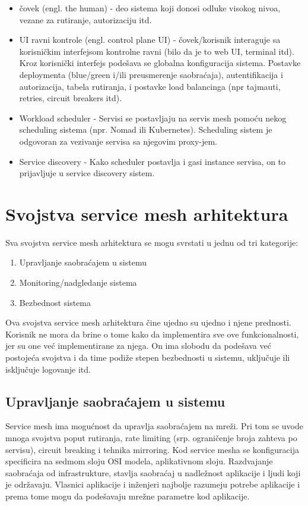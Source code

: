\documentclass[a4paper,12pt]{report}
\begin{document}
\begin{itemize}
	\item čovek (engl. the human) - deo sistema koji donosi odluke visokog nivoa, vezane za rutiranje, autorizaciju itd. 
	\item UI ravni kontrole (engl. control plane UI) - čovek/korisnik interaguje sa korisničkim interfejsom kontrolne ravni (bilo da je to web UI, terminal itd). Kroz korisnički interfejs podešava se globalna konfiguracija sistema. Postavke deploymenta (blue/green i/ili preusmerenje saobraćaja), autentifikacija i autorizacija, tabela rutiranja, i postavke load balancinga (npr tajmauti, retries, circuit breakers itd).
	\item Workload scheduler - Servisi se postavljaju na servis mesh pomoću nekog scheduling sistema (npr. Nomad ili Kubernetes). Scheduling sistem je odgovoran za vezivanje servisa sa njegovim proxy-jem.
	\item Service discovery - Kako scheduler postavlja i gasi instance servisa, on to prijavljuje u service discovery sistem. 
\end{itemize}


\chapter{Svojstva service mesh arhitektura}

Sva svojstva service mesh arhitektura se mogu svrstati u jednu od tri kategorije:

\begin{enumerate}
	\item Upravljanje saobraćajem u sistemu
	\item Monitoring/nadgledanje sistema
	\item Bezbednost sistema
\end{enumerate}

Ova svojstva service mesh arhitektura čine ujedno su ujedno i njene prednosti. Korisnik ne mora da brine o tome kako da implementira sve ove funkcionalnosti, jer su one već implementirane za njega. On ima slobodu da podešava već postojeća svojstva i da time podiže stepen bezbednosti u sistemu, uključuje ili isključuje logovanje itd. 

\section{Upravljanje saobraćajem u sistemu}

Service mesh ima mogućnost da upravlja saobraćajem na mreži. Pri tom se uvode mnoga svojstva poput rutiranja, rate limiting (srp. ograničenje broja zahteva po servisu),  circuit breaking i tehnika mirroring. Kod service mesha se konfiguracija specificira na sedmom sloju OSI modela, aplikativnom sloju. Razdvajanje saobraćaja od infrastrukture, stavlja saobraćaj u nadležnost aplikacije i ljudi koji je održavaju. Vlasnici aplikacije i inženjeri najbolje razumeju potrebe aplikacije i prema tome mogu da podešavaju mrežne parametre kod aplikacije. \newline
\end{document}
